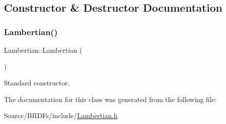 \subsection{Constructor \& Destructor Documentation}
\hypertarget{class_lambertian_a9a6eb485fd890f0873ed144ed8cbbfb2}{}\label{class_lambertian_a9a6eb485fd890f0873ed144ed8cbbfb2} 
\subsubsection{\texorpdfstring{Lambertian()}{Lambertian()}}
{\footnotesize\ttfamily Lambertian\+::\+Lambertian (\begin{DoxyParamCaption}{ }\end{DoxyParamCaption})}

Standard constructor. 

The documentation for this class was generated from the following file\+:\begin{DoxyCompactItemize}
\item 
Source/\+B\+R\+D\+Fs/include/\hyperlink{_lambertian_8h}{Lambertian.\+h}\end{DoxyCompactItemize}
